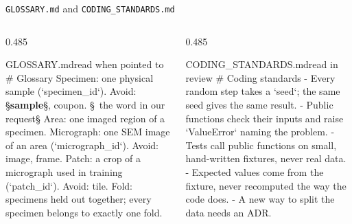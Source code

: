 \begin{frame}[fragile,source={Pocock (2026), mattpocock/skills v1.3.1: domain-modeling, code-review, retro}]{\texttt{GLOSSARY.md} and \texttt{CODING\_STANDARDS.md}}
  \begin{columns}[T,onlytextwidth]
    \begin{column}{0.485\textwidth}
\begin{codefile}[basicstyle=\ttfamily\fontsize{7}{8.5}\selectfont]{GLOSSARY.md\enspace\textcolor{udsgreymid}{\sffamily\scriptsize read when pointed to}}
# Glossary
Specimen: one physical sample (`specimen_id`).
  Avoid: §\textcolor{udsred}{\bfseries sample}§, coupon. §\textcolor{udsred}{\sffamily\scriptsize\faArrowLeft\ the word in our request}§
Area: one imaged region of a specimen.
Micrograph: one SEM image of an area
  (`micrograph_id`). Avoid: image, frame.
Patch: a crop of a micrograph used in
  training (`patch_id`). Avoid: tile.
Fold: specimens held out together; every
  specimen belongs to exactly one fold.
\end{codefile}
    \end{column}
    \begin{column}{0.485\textwidth}
\begin{codefile}[basicstyle=\ttfamily\fontsize{7}{8.5}\selectfont]{CODING\_STANDARDS.md\enspace\textcolor{udsgreymid}{\sffamily\scriptsize read in review}}
# Coding standards
- Every random step takes a `seed`; the
  same seed gives the same result.
- Public functions check their inputs and
  raise `ValueError` naming the problem.
- Tests call public functions on small,
  hand-written fixtures, never real data.
- Expected values come from the fixture,
  never recomputed the way the code does.
- A new way to split the data needs an ADR.
\end{codefile}
    \end{column}
  \end{columns}
\end{frame}
